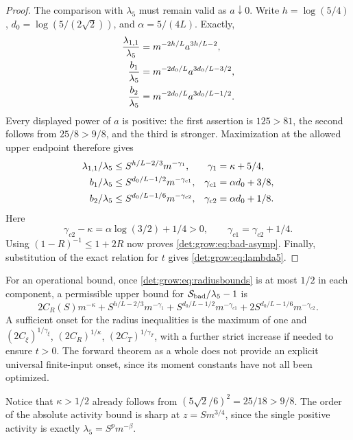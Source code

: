 \documentclass[11pt,letterpaper]{article}
\numberwithin{equation}{section}
\theoremstyle{definition}\newtheorem{definition}[theorem]{Definition}
\theoremstyle{remark}\newtheorem{remark}[theorem]{Remark}
\begin{document}
\begin{proof}
The comparison with $\lambda_5$ must remain valid as $a\downarrow0$.
Write $h=\log(5/4)$, $d_0=\log(5/(2\sqrt2))$, and $\alpha=5/(4L)$.
Exactly,
\begin{align}\label{det:grow:eq:activityratios}
 \frac{\lambda_{1,1}}{\lambda_5}
 &=m^{-2h/L}a^{3h/L-2},\\
 \frac{b_1}{\lambda_5}&=m^{-2d_0/L}a^{3d_0/L-3/2},\notag\\
 \frac{b_2}{\lambda_5}&=m^{-2d_0/L}a^{3d_0/L-1/2}.\notag
\end{align}
Every displayed power of $a$ is positive: the first assertion is
$125>81$, the second follows from $25/8>9/8$, and the third is stronger.
Maximization at the allowed upper endpoint therefore gives
\begin{align}\label{det:grow:eq:comparisonbounds}
 \lambda_{1,1}/\lambda_5&\le S^{h/L-2/3}m^{-\gamma_1},&
 \gamma_1&=\kappa+5/4,\\
 b_1/\lambda_5&\le S^{d_0/L-1/2}m^{-\gamma_{c1}},&
 \gamma_{c1}&=\alpha d_0+3/8,\notag\\
 b_2/\lambda_5&\le S^{d_0/L-1/6}m^{-\gamma_{c2}},&
 \gamma_{c2}&=\alpha d_0+1/8.\notag
\end{align}
Here
\[
 \gamma_{c2}-\kappa=\alpha\log(3/2)+1/4>0,\qquad
 \gamma_{c1}=\gamma_{c2}+1/4.
\]
Using $(1-R)^{-1}\le1+2R$ now proves \eqref{det:grow:eq:bad-asymp}.
Finally, substitution of the exact relation for $t$ gives
\eqref{det:grow:eq:lambda5}.
\end{proof}

For an operational bound, once \eqref{det:grow:eq:radiusbounds} is at most
$1/2$ in each component, a permissible upper bound for
$\mathcal S_{\rm bad}/\lambda_5-1$ is
\begin{equation}\label{det:grow:eq:explicit-bad-error}
 2C_R(S)m^{-\kappa}+S^{h/L-2/3}m^{-\gamma_1}
 +S^{d_0/L-1/2}m^{-\gamma_{c1}}
 +2S^{d_0/L-1/6}m^{-\gamma_{c2}}.
\end{equation}
A sufficient onset for the radius inequalities is the maximum of one
and $(2C_\xi)^{1/\gamma_\xi}$, $(2C_R)^{1/\kappa}$,
$(2C_T)^{1/\gamma_T}$, with a further strict increase if needed to
ensure $t>0$. The forward theorem as a whole does not provide an
explicit universal finite-input onset, since its moment constants have
not all been optimized.

Notice that $\kappa>1/2$ already follows from
$(5\sqrt2/6)^2=25/18>9/8$. The order of the absolute activity bound is
sharp at $z=S m^{3/4}$, since the single positive activity is exactly
$\lambda_5=S^p m^{-\beta}$.
\end{document}
